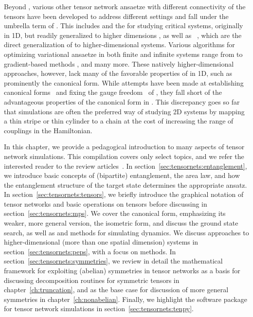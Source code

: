 %
Beyond , various other tensor network ansaetze with different connectivity of the tensors have been developed to address different settings and fall under the umbrella term of .
%
This includes  \cite{shi2006} and the  \cite{vidal2007a, evenbly2009} for studying critical systems, originally in 1D, but readily generalized to higher dimensions \cite{tagliacozzo2009, cincio2008}, as well as ~\cite{nishio2004, verstraete2004}, which are the direct generalization of  to higher-dimensional systems.
%
Various algorithms for optimizing variational  ansaetze in both finite and infinite systems range from  \cite{yang2017} to gradient-based methods \cite{liao2019, hasik2021, francuz2023}, and many more.
%
These natively higher-dimensional approaches, however, lack many of the favorable properties of  in 1D, such as prominently the canonical form.
%
While attempts have been made at establishing canonical forms~\cite{zaletel2020, lin2022} and fixing the gauge freedom~\cite{evenbly2018} of , they fall short of the advantageous properties of the canonical form in .
%
This discrepancy goes so far that  simulations are often the preferred way of studying 2D systems by mapping a thin stripe or thin cylinder to a chain at the cost of increasing the range of couplings in the Hamiltonian.

In this chapter, we provide a pedagogical introduction to many aspects of tensor network simulations.
%
This compilation covers only select topics, and we refer the interested reader to the review articles~\cite{orus2014a, schollwock2011, paeckel2019, cirac2021, banuls2023a}.
%
In section~\ref{sec:tensornets:entanglement}, we introduce basic concepts of (bipartite) entanglement, the area law, and how the entanglement structure of the target state determines the appropriate  ansatz.
%
In section~\ref{sec:tensornets:tensors}, we briefly introduce the graphical notation of tensor networks and basic operations on tensors before discussing  in section~\ref{sec:tensornets:mps}.
%
We cover the canonical form, emphasizing its weaker, more general version, the isometric form, and discuss the  ground state search, as well as  and  methods for simulating dynamics.
%
We discuss  approaches to higher-dimensional (more than one spatial dimension) systems in section~\ref{sec:tensornets:peps}, with a focus on  methods.
%
In section~\ref{sec:tensornets:symmetries}, we review in detail the mathematical framework for exploiting (abelian) symmetries in tensor networks as a basis for discussing decomposition routines for symmetric tensors in chapter~\ref{ch:truncation}, and as the base case for discussion of more general symmetries in chapter~\ref{ch:nonabelian}.
%
Finally, we highlight the  software package for tensor network simulations in section~\ref{sec:tensornets:tenpy}.
